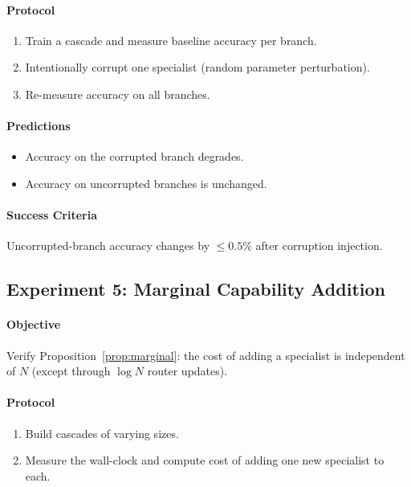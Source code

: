 \documentclass[11pt,a4paper]{article}
\theoremstyle{definition}
\theoremstyle{remark}
\begin{document}
\paragraph{Protocol}
\begin{enumerate}
    \item Train a cascade and measure baseline accuracy per branch.
    \item Intentionally corrupt one specialist (random parameter perturbation).
    \item Re-measure accuracy on all branches.
\end{enumerate}

\paragraph{Predictions}
\begin{itemize}
    \item Accuracy on the corrupted branch degrades.
    \item Accuracy on uncorrupted branches is unchanged.
\end{itemize}

\paragraph{Success Criteria}
Uncorrupted-branch accuracy changes by $\leq 0.5\%$ after corruption injection.

\subsection{Experiment 5: Marginal Capability Addition}

\paragraph{Objective} Verify Proposition~\ref{prop:marginal}: the cost of adding a specialist is independent of $N$ (except through $\log N$ router updates).

\paragraph{Protocol}
\begin{enumerate}
    \item Build cascades of varying sizes.
    \item Measure the wall-clock and compute cost of adding one new specialist to each.
\end{enumerate}
\end{document}
